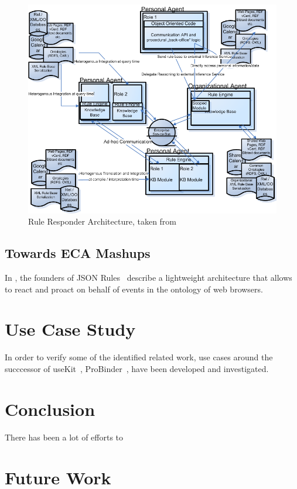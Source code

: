 \documentclass[11pt,twocolumn]{article}
\begin{document}
\begin{figure}[htb]
\begin{center}
\includegraphics[scale=0.4]{img_rr01}
\caption{Rule Responder Architecture, taken from \cite{2007-Paschke_etal-RuleResponder.pdf}}
\end{center}
\end{figure}


\subsection{Towards ECA Mashups}
In \cite{2009-Pascalau_Giurca-LWAECARE.pdf}, the founders of JSON Rules~\cite{2008-Giurca_Pascalau-JSON_Rules.pdf} describe a lightweight architecture that allows to react and proact on behalf of events in the ontology of web browsers.



\section{Use Case Study}
In order to verify some of the identified related work, use cases around the succcessor of useKit~\cite{2010-Rizzotti_Burkhart-useKit.pdf}, ProBinder~\cite{wwwprobinder}, have been developed and investigated. 

\section{Conclusion}
There has been a lot of efforts to  


\section{Future Work}




\end{document}

